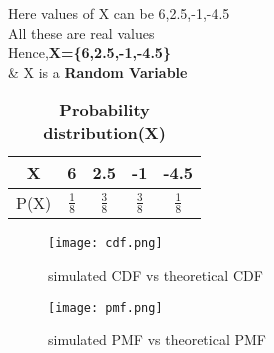 \documentclass[11pt,a4paper,twocolumn]{article}
\begin{document}
Here values of X can be 6,2.5,-1,-4.5\\
All these are real values\\
Hence,\textbf{X=\{6,2.5,-1,-4.5\}}\\
\& X is a \textbf{Random Variable}
\begin{table}[h!]
    \centering
    \begin{tabular}{|c|c|c|c|c|}
    \hline
         X&6&2.5&-1&-4.5  \\[5pt]
         \hline
         P(X)&$\frac{1}{8}$&$\frac{3}{8}$&$\frac{3}{8}$&$\frac{1}{8}$ \\[5pt]
         \hline
    \end{tabular}
    \caption{\textbf{Probability distribution(X)}}
    \label{tab:my_label}
\end{table}
\begin{figure}[h!]
    \centering
    \texttt{[image: cdf.png]}
    \caption{simulated CDF vs theoretical CDF}
\end{figure}
\begin{figure}[h!]
    \centering
    \texttt{[image: pmf.png]}
    \caption{simulated PMF vs theoretical PMF}
\end{figure}
\end{document}
